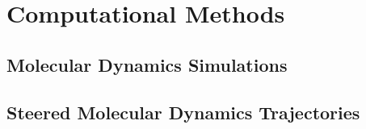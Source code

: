 \section{Computational Methods}

\subsection{Molecular Dynamics Simulations}

\subsection{Steered Molecular Dynamics Trajectories}

